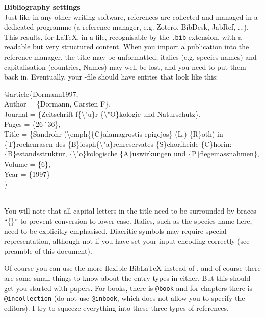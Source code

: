\begin{boxmd}
	\textbf{Bibliography settings}\\
	Just like in any other writing software, references are collected and managed in a dedicated programme (a reference manager, e.g. Zotero, BibDesk, JabRef, ...). This results, for \LaTeX, in a \BibTeX\/ file, recognisable by the \texttt{.bib}-extension, with a readable but very structured content. When you import a publication into the reference manager, the title may be unformatted; italics (e.g. species names) and capitalisation (countries, Names) may well be lost, and you need to put them back in. 
	Eventually, your \BibTeX-file should have entries that look like this:\\
	\begin{footnotesize}
	\begin{ttfamily}	
	@article\{Dormann1997,\\
	Author = \{Dormann, Carsten F\}, \\
	Journal = \{Zeitschrift f\{\textbackslash"u\}r \{\textbackslash"O\}kologie und Naturschutz\},\\
	Pages = \{26-\.-36\},\\
	Title = \{Sandrohr (\textbackslash emph\{\{C\}alamagrostis epigejos\} (L.) \{R\}oth) in \{T\}rockenrasen des \{B\}iosph\{\textbackslash "a\}renreservates \{S\}chorfheide-\{C\}horin: \{B\}estandsstruktur, \{\textbackslash"o\}kologische \{A\}uswirkungen und \{P\}flegemassnahmen\},\\
	Volume = \{6\},\\
	Year = \{1997\}\\
	\}
	\end{ttfamily}
	\end{footnotesize}\\
	You will note that all capital letters in the title need to be surrounded by braces ``\{\}'' to prevent conversion to lower case. Italics, such as the species name here, need to be explicitly emphasised. Diacritic symbols may require special representation, although not if you have set your input encoding correctly (see preamble of this document).
	
	Of course you can use the more flexible Bib\LaTeX\/ instead of \BibTeX, and of course there are some small things to know about the entry types in either. But this should get you started with papers. For books, there is \texttt{\makeatletter @\makeatother book} and for chapters there is \texttt{\makeatletter @\makeatother incollection} (do not use \texttt{\makeatletter @\makeatother inbook}, which does not allow you to specify the editors). I try to squeeze everything into these three types of references.
	

\end{boxmd}
